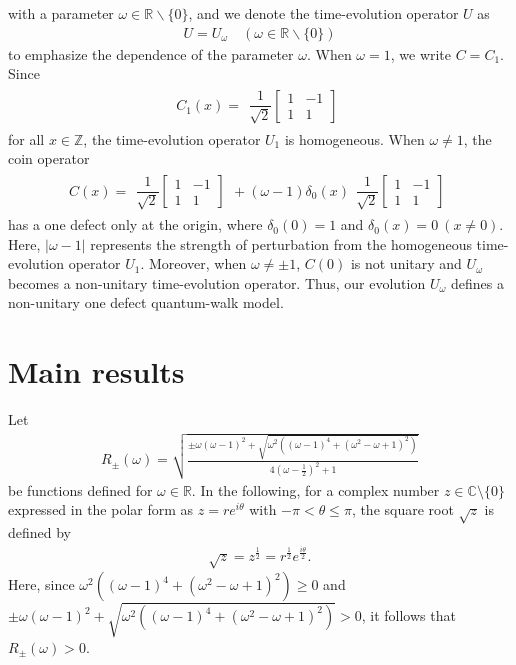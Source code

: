\documentclass[a4paper,12pt]{article}
\theoremstyle{plain}
\theoremstyle{definition}
\theoremstyle{definition}
\begin{document}
with a parameter $\omega \in \mathbb{R}\backslash\{0\}$, and we denote the time-evolution operator $U$ as 
\begin{eqnarray}
U=U_\omega  \quad (\omega \in \mathbb{R}\backslash\{0\}) \nonumber
\end{eqnarray}
to emphasize the dependence of the parameter $\omega$. When $\omega =1$, we write $C=C_1$. Since
\begin{eqnarray}
C_1(x)=\begin{array}{ll}
\dfrac{1}{\sqrt{2}}\begin{bmatrix}
1&-1\\ 
1& 1
\end{bmatrix} 
\end{array} \nonumber
\end{eqnarray}
for all $x \in {\mathbb Z}$, 
the time-evolution operator $U_1$ is homogeneous. When $\omega \neq 1$, the coin operator 
\begin{eqnarray}
C(x)=\begin{array}{ll}
\dfrac{1}{\sqrt{2}}\begin{bmatrix}
1&-1\\ 
1& 1
\end{bmatrix}
\end{array} 
+(\omega -1)\delta_{0}(x)
\begin{array}{ll}
\dfrac{1}{\sqrt{2}}\begin{bmatrix}
1&-1\\ 
1& 1
\end{bmatrix}
\end{array} \nonumber
\end{eqnarray}
has a one defect only at the origin, where $\delta_{0}(0)=1$ and $\delta_{0}(x)=0 ~ (x\neq 0)$. Here, $|\omega -1|$ represents the strength of perturbation from the homogeneous time-evolution operator $U_1$. Moreover, when $\omega \neq \pm 1$, $C(0)$ is not unitary and $U_{\omega}$ becomes a non-unitary time-evolution operator. 
Thus, our evolution $U_\omega$ defines a non-unitary one defect quantum-walk model.

\section{Main results}

Let
\begin{align}
R_{\pm}(\omega) =\sqrt{\frac{\pm \omega(\omega-1)^2+\sqrt{\omega^2 ((\omega -1)^4 +(\omega^2-\omega +1)^2 )}}{4(\omega -\frac{1}{2})^2+1}} \label{202}
\end{align}
be functions defined for $\omega \in \mathbb{R}$. In the following, for a complex number $z\in \mathbb{C} \setminus \{0\}$ expressed in the polar form as $z=re^{i\theta}$ with $-\pi < \theta \leq \pi$, the square root $\sqrt{z}$ is defined by
\begin{align*}
    \sqrt{z} = z^{\frac{1}{2}}=r^{\frac{1}{2}}e^{\frac{i\theta}{2}}.
\end{align*}
Here, since $\omega^2 ((\omega -1)^4 +(\omega^2-\omega +1)^2) \geq 0$ and $\pm \omega(\omega-1)^2+\sqrt{\omega^2 ((\omega -1)^4 +(\omega^2-\omega +1)^2 )} > 0$, it follows that $R_{\pm}(\omega)> 0$.
\end{document}
